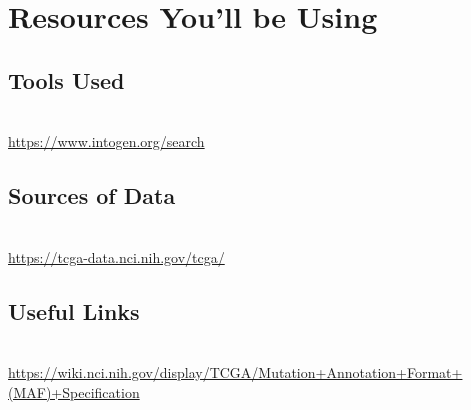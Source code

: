 \section{Resources You'll be Using}

\subsection{Tools Used}

\begin{description}[style=multiline,labelindent=0cm,align=left,leftmargin=1cm]
  \item[IntOGen mutations platform] \hfill\\
    \url{https://www.intogen.org/search}
\end{description}


\subsection{Sources of Data}

\begin{description}[style=multiline,labelindent=0cm,align=left,leftmargin=1cm]
 \item[TCGA melanoma somatic SNV data from 338 tumour samples] \hfill\\
  \url{https://tcga-data.nci.nih.gov/tcga/}
\end{description}


\subsection{Useful Links}

\begin{description}[style=multiline,labelindent=0cm,align=left,leftmargin=1cm]
 \item[Mutation Annotation Format (MAF) specification] \hfill\\
  \url{https://wiki.nci.nih.gov/display/TCGA/Mutation+Annotation+Format+(MAF)+Specification}
\end{description}

\newpage


